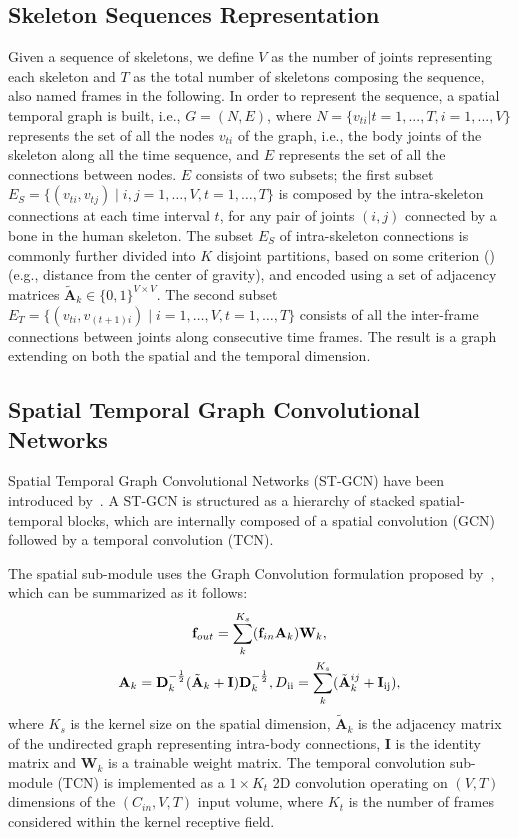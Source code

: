 \documentclass[times,twocolumn,final,authoryear]{elsarticle}
\begin{document}
\subsection{Skeleton Sequences Representation}

Given a sequence of skeletons, we define $V$ as the number of joints representing each skeleton and $T$ as the total number of skeletons composing the sequence, also named frames in the following.
In order to represent the sequence, a spatial temporal graph is built, i.e., $G=(N,E)$, where $N=\{v_{ti}|t=1,...,T,i=1,...,V\}$ represents the set of all the nodes $v_{ti}$ of the graph, i.e., the body joints of the skeleton along all the time sequence, and $E$ represents the set of all the connections between nodes. $E$ consists of two subsets; the first subset $E_S=\{(v_{ti},v_{tj}) \mid i,j = 1,\dots,V, t=1,\dots,T\}$ is composed by the intra-skeleton connections at each time interval $t$, for any pair of joints $(i,j)$ connected by a bone in the human skeleton. The subset $E_S$ of intra-skeleton connections is commonly further divided into $K$ disjoint partitions, based on some criterion (\cite{yan2018spatial}) (e.g., distance from the center of gravity), and encoded using a set of adjacency matrices $\tilde{\mathbf{A}}_k \in \{0,1\}^{V \times V}$. The second subset $E_T=\{(v_{ti},v_{(t+1)i}) \mid i=1,\dots,V, t=1,\dots,T\}$ consists of all the inter-frame connections between joints along consecutive time frames. The result is a graph extending on both the spatial and the temporal dimension.


\subsection{Spatial Temporal Graph Convolutional Networks}\label{st-gcn}

Spatial Temporal Graph Convolutional Networks (ST-GCN) have been introduced by~\cite{yan2018spatial}. A ST-GCN is structured as a hierarchy of stacked spatial-temporal blocks, which are internally composed of a spatial convolution (GCN) followed by a temporal convolution (TCN). 

The spatial sub-module uses the Graph Convolution formulation proposed by~\cite{Kipf:2016tc}, which can be summarized as it follows:
\begin{gather}
\label{eq1}
\textbf{f}_{out}=\sum^{K_s}_k(\textbf{f}_{in}\mathbf{A}_k)\textbf{W}_k, \\
\mathbf{A}_k=\textbf{D}_k^{-\frac{1}{2}} ({{{{\tilde{\textbf{A}}_k}+\textbf{I}}}}) \textbf{D}_k^{-\frac{1}{2}}, D\textsubscript{ii}=\sum^{K_s}_k (\tilde{\mathbf{A}}^{ij}_k+\mathbf{I}\textsubscript{ij}),
\end{gather}
where $K_s$ is the kernel size on the spatial dimension, ${\tilde{\textbf{{A}}}_k}$ is the adjacency matrix of the undirected graph representing intra-body connections, \textbf{I} is the identity matrix and $\textbf{W}_k$ is a trainable weight matrix. The temporal convolution sub-module (TCN) is implemented as a $1 \times K_t$ 2D convolution operating on $(V, T)$ dimensions of the $(C_{in}, V, T)$ input volume, where $K_t$ is the number of frames considered within the kernel receptive field. 
\end{document}
